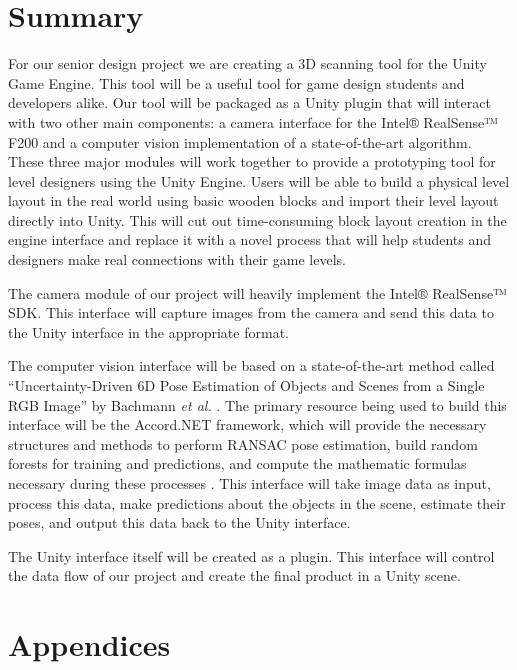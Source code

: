 \documentclass[12pt]{article}
\begin{document}
\section{Summary}\label{summary}

For our senior design project we are creating a 3D scanning tool for the
Unity Game Engine. This tool will be a useful tool for game design
students and developers alike. Our tool will be packaged as a Unity
plugin that will interact with two other main components: a camera
interface for the Intel® RealSense™ F200 and a computer vision
implementation of a state-of-the-art algorithm. These three major
modules will work together to provide a prototyping tool for level
designers using the Unity Engine. Users will be able to build a physical
level layout in the real world using basic wooden blocks and import
their level layout directly into Unity. This will cut out time-consuming
block layout creation in the engine interface and replace it with a
novel process that will help students and designers make real
connections with their game levels.

The camera module of our project will heavily implement the Intel®
RealSense™ SDK. This interface will capture images from the camera and
send this data to the Unity interface in the appropriate format.

The computer vision interface will be based on a state-of-the-art method
called ``Uncertainty-Driven 6D Pose Estimation of Objects and Scenes
from a Single RGB Image'' by Bachmann \emph{et al.} \autocite{bachmann}.
The primary resource being used to build this interface will be the
Accord.NET framework, which will provide the necessary structures and
methods to perform RANSAC pose estimation, build random forests for
training and predictions, and compute the mathematic formulas necessary
during these processes \autocite{accord}. This interface will take image
data as input, process this data, make predictions about the objects in
the scene, estimate their poses, and output this data back to the Unity
interface.

The Unity interface itself will be created as a plugin. This interface
will control the data flow of our project and create the final product
in a Unity scene.

\section{Appendices}\label{appendices}
\end{document}
